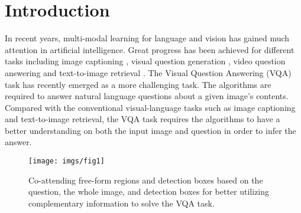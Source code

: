 \documentclass[letterpaper]{article}
\begin{document}
\section{Introduction}

In recent years, multi-modal learning for language and vision has gained much attention in artificial intelligence. Great progress has been achieved for different tasks including image captioning \cite{karpathy2015deep}, visual question generation \cite{mostafazadeh2016generating,li2017visual}, video question answering \cite{ye2017video} and text-to-image retrieval \cite{xie2016online,li2017person}. The Visual Question Answering (VQA) \cite{antol2015vqa} task has recently emerged as a more challenging task. The algorithms are required to answer natural language questions about a given image's contents. Compared with the conventional visual-language tasks such as image captioning and text-to-image retrieval, the VQA task requires the algorithms to have a better understanding on both the input image and question in order to infer the answer.

\begin{figure}[!]
	\centering
	\texttt{[image: imgs/fig1]}
	\caption{Co-attending free-form regions and detection boxes based on the question, the whole image, and detection boxes for better utilizing complementary information to solve the VQA task.}
	\label{fig:bimlt-demo}
\end{figure}
\end{document}
